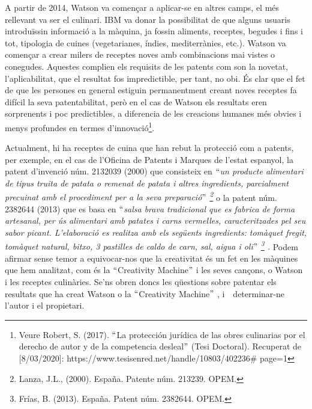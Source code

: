 \documentclass[12pt]{article}
\renewcommand{\_}{\kern-1.5pt\textunderscore\kern-1.5pt}
\begin{document}
\begin{itemize}
\vspace{\baselineskip}
A partir de 2014, Watson va començar a aplicar-se en altres camps, el més rellevant va ser el culinari. IBM va donar la possibilitat de que alguns usuaris introduïssin informació a la màquina, ja fossin aliments, receptes, begudes i fins i tot, tipologia de cuines (vegetarianes, índies, mediterrànies, etc.). Watson va començar a crear milers de receptes noves amb combinacions mai vistes o conegudes. Aquestes complien els requisits de les patents com son la novetat, l’aplicabilitat, que el resultat fos impredictible, per tant, no obi. És clar que el fet de que les persones en general estiguin permanentment creant noves receptes fa difícil la seva patentabilitat, però en el cas de Watson els resultats eren sorprenents i poc predictibles, a diferencia de les creacions humanes més obvies i menys profundes en termes d’innovació\footnote{ Veure Robert, S. (2017). $``$La protección jurídica de las obres culinarias por el derecho de autor y de la competencia desleal$"$  (Tesi Doctoral). Recuperat de [8/03/2020]: https://www.tesisenred.net/handle/10803/402236$\#$ page=1 }. \par


\vspace{\baselineskip}
Actualment, hi ha receptes de cuina que han rebut la protecció com a patents, per exemple, en el cas de l’Oficina de Patents i Marques de l’estat espanyol, la patent d’invenció núm. 2132039 (2000) que consisteix en \textit{$``$un producte alimentari de tipus truita de patata o remenat de patata i altres ingredients, parcialment precuinat amb el procediment per a la seva preparació$"$ \footnote{ Lanza, J.L., (2000). España. Patente núm. 213239. OPEM. } }o la patent núm. 2382644 (2013) que es basa en $``$\textit{salsa brava tradicional que es fabrica de forma artesanal, per ús alimentari amb patates i carns vermelles, caracteritzades pel seu sabor picant. L’elaboració es realitza amb els següents ingredients: tomàquet fregit, tomàquet natural, bitxo, 3 pastilles de caldo de carn, sal, aigua i oli$"$ \footnote{ Frías, B. (2013). España. Patent núm. 2382644. OPEM.  } . }Podem afirmar sense temor a equivocar-nos que la creativitat és un fet en les màquines que hem analitzat, com és la $``$Creativity Machine$"$  i les  seves cançons, o Watson i les receptes culinàries.\textit{ }Se’ns obren doncs les qüestions sobre patentar els resultats que ha creat Watson o la $``$Creativity Machine$"$ , i\ \ determinar-ne l’autor i  el propietari.\  \par



\end{itemize}
\end{document}
